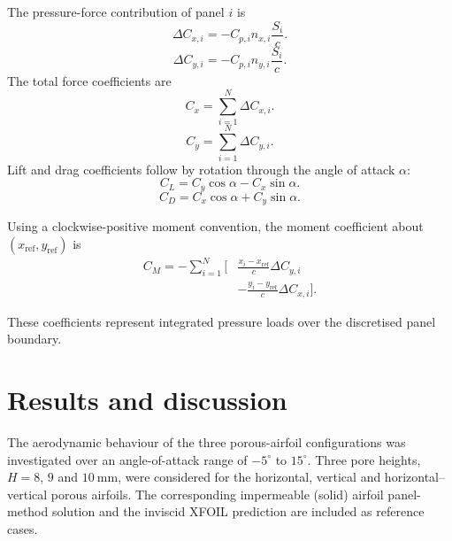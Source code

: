 \documentclass[a4paper,fleqn]{cas-dc}
\begin{document}
The pressure-force contribution of panel $i$ is
\begin{equation}
	\Delta C_{x,i}
	=
	-C_{p,i}n_{x,i}\frac{S_i}{c}.
	\label{eq:panel_x_force}
\end{equation}
\begin{equation}
	\Delta C_{y,i}
	=
	-C_{p,i}n_{y,i}\frac{S_i}{c}.
	\label{eq:panel_y_force}
\end{equation}
The total force coefficients are
\begin{equation}
	C_x=\sum_{i=1}^{N}\Delta C_{x,i}.
	\label{eq:total_x_force}
\end{equation}
\begin{equation}
	C_y=\sum_{i=1}^{N}\Delta C_{y,i}.
	\label{eq:total_y_force}
\end{equation}
Lift and drag coefficients follow by rotation through
the angle of attack $\alpha$:
\begin{equation}
	C_L=C_y\cos\alpha-C_x\sin\alpha.
	\label{eq:lift_coefficient}
\end{equation}
\begin{equation}
	C_D=C_x\cos\alpha+C_y\sin\alpha.
	\label{eq:drag_coefficient}
\end{equation}

Using a clockwise-positive moment convention, the moment
coefficient about $(x_{\mathrm{ref}},y_{\mathrm{ref}})$ is
\begin{equation}
	\begin{split}
		C_M=-\sum_{i=1}^{N}
		\Bigg[
		&\frac{x_i-x_{\mathrm{ref}}}{c}
		\Delta C_{y,i}
		\\
		&-
		\frac{y_i-y_{\mathrm{ref}}}{c}
		\Delta C_{x,i}
		\Bigg].
	\end{split}
	\label{eq:moment_coefficient}
\end{equation}

These coefficients represent integrated pressure loads over the discretised panel boundary.
	
	\section{Results and discussion}
	\label{sec:results_discussion}
	
	The aerodynamic behaviour of the three porous-airfoil configurations
	was investigated over an angle-of-attack range of $-5^\circ$ to
	$15^\circ$. Three pore heights, $H=8$, $9$ and $10~\mathrm{mm}$,
	were considered for the horizontal, vertical and horizontal--vertical
	porous airfoils. The corresponding impermeable (solid) airfoil
	panel-method solution and the inviscid XFOIL prediction are included as
	reference cases.
	
\end{document}
